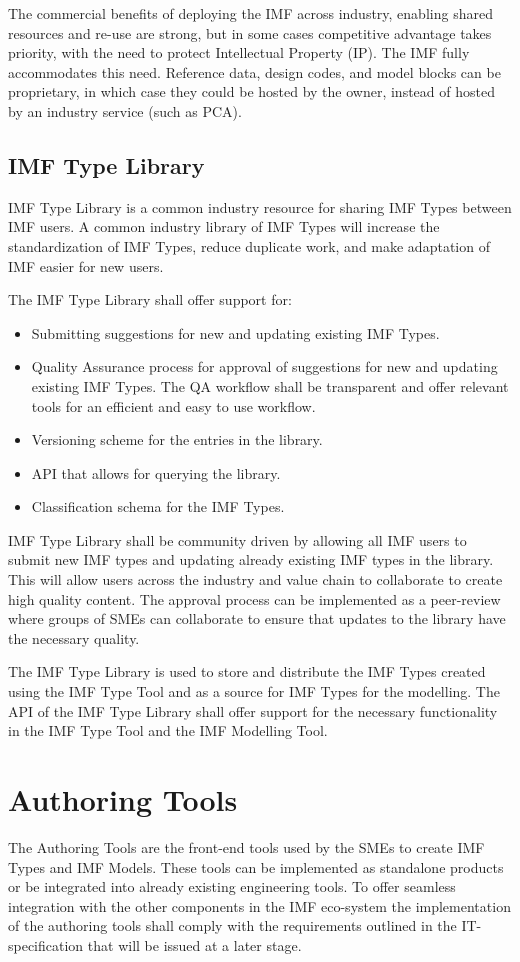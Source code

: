 The commercial benefits of deploying the IMF across industry, enabling shared resources and re-use are strong, but in
some cases competitive advantage takes priority, with the need to protect Intellectual Property (IP). The IMF fully
accommodates this need. Reference data, design codes, and model blocks can be proprietary, in which case they could
be hosted by the owner, instead of hosted by an industry service (such as PCA).

\subsection{IMF Type Library}
IMF Type Library is a common industry resource for sharing IMF Types between IMF users. A
common industry library of IMF Types will increase the standardization of IMF Types, reduce duplicate work, and make
adaptation of IMF easier for new users.

The IMF Type Library shall offer support for:

\begin{itemize}
  \item Submitting suggestions for new and updating existing IMF Types.
  \item Quality Assurance process for approval of suggestions for new and updating existing IMF Types. The QA workflow
        shall be transparent and offer relevant tools for an efficient and easy to use workflow.
  \item Versioning scheme for the entries in the library.
  \item API that allows for querying the library.
  \item Classification schema for the IMF Types.
\end{itemize}
IMF Type Library shall be community driven by allowing all IMF users to submit new IMF types and updating already
existing IMF types in the library. This will allow users across the industry and value chain to collaborate to create
high quality content. The approval process can be implemented as a peer-review where groups of SMEs can collaborate
to ensure that updates to the library have the necessary quality.

The IMF Type Library is used to store and distribute the IMF Types created using the IMF Type Tool and as a source for
IMF Types for the modelling. The API of the IMF Type Library shall offer support for the necessary functionality in
the IMF Type Tool and the IMF Modelling Tool.

\section{Authoring Tools}
The Authoring Tools are the front-end tools used by the SMEs to create IMF Types and IMF
Models. These tools can be implemented as standalone products or be integrated into already existing engineering
tools. To offer seamless integration with the other components in the IMF eco-system the implementation of the
authoring tools shall comply with the requirements outlined in the IT-specification that will be issued at a later
stage.

